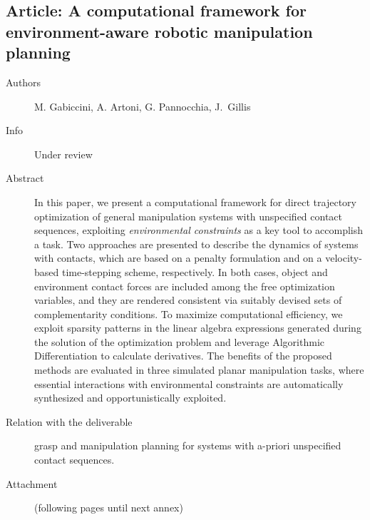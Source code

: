 \documentclass[a4paper,11pt,pdf]{pacmanreport}
\begin{document}
\subsection{Article: A computational framework for environment-aware robotic manipulation planning} \label{ann:env-awareManipulation}
\begin{description} 
    \item[Authors] M. Gabiccini, A. Artoni, G. Pannocchia, J.~Gillis
    \item[Info] Under review
    \item[Abstract] In this paper, we present a computational framework for direct trajectory optimization of general manipulation systems with unspecified contact sequences, exploiting \emph{environmental constraints} as a key tool to accomplish a task.
    Two approaches are presented to describe the dynamics of systems with contacts, which are based on a penalty formulation and on a velocity-based time-stepping scheme, respectively. In  both cases, object and environment contact forces are included among the free optimization variables, and they are rendered consistent via suitably devised sets of complementarity conditions.
    To maximize computational efficiency, we exploit sparsity patterns in the linear algebra expressions generated during the solution of the optimization problem and leverage Algorithmic Differentiation to calculate derivatives. %
    The benefits of the proposed methods are evaluated in three simulated planar manipulation tasks, where essential interactions with environmental constraints are automatically synthesized and opportunistically exploited.
    \item[Relation with the deliverable] grasp and manipulation planning for systems with a-priori unspecified contact sequences.
    \item[Attachment] (following pages until next annex)
\end{description}


\end{document}
